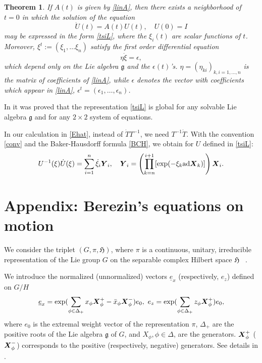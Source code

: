 \documentclass[12pt]{amsart}
\numberwithin{equation}{section}
\newtheorem{Theorem}{Theorem}
\theoremstyle{definition}
\begin{document}
\begin{Theorem}
If $A(t)$ is  given by \eqref{linA},  then there exists a neighborhood
of $t=0$ in which the solution of the equation
\begin{equation}\label{dotU}
\dot{U}(t)=A(t)U(t), \quad U(0)=I
\end{equation}
may be expressed in the form \eqref{tsiL}, where the $\xi_i(t)$ are
scalar functions of $t$. Moreover, $\xi^t:=(\xi_1,\dots \xi_n)$ satisfy the first order 
differential equation
\begin{equation}\label{solwei}
\eta\dot{\xi}=\epsilon,
\end{equation}
 which depend only on the Lie algebra ${{\mathfrak{{g}}}}$
and the $\epsilon(t)$'s. $\eta=(\eta_{ki})_{k,i=1,\dots,n}$ is the matrix of coefficients of \eqref{linA}, while $\epsilon$
denotes the vector with coefficients which appear in \eqref{linA},  $ \epsilon^t=(\epsilon_1,\dots,\epsilon_n)$. 
\end{Theorem}
In \cite{wei} it was proved that the representation \eqref{tsiL} is
global for any solvable Lie algebra ${{\mathfrak{{g}}}}$ and for any $2\times 2$
system of equations. 

In our calculation  in \eqref{Ehat}, instead of $\dot{T}T^{-1}$, we need
$T^{-1}\dot{T}$. 
With the convention \eqref{conv} and the Baker-Hausdorff formula \eqref{BCH}, we obtain
for $U$ defined in \eqref{tsiL}:
\begin{equation}\label{timndot}
U^{-1}(\xi)\dot{U}(\xi)=\sum_{i=1}^n\dot{\xi}_i{{\mbox{\boldmath{${Y}$}}}}_i, \quad {{\mbox{\boldmath{${Y}$}}}}_i= \left(\prod_{k=n}^{i+1}[\exp(-\xi_k{{\mbox{\rm ad}}} {{\mbox{\boldmath{${X}$}}}}_k)]\right){{\mbox{\boldmath{${X}$}}}}_i.
\end{equation}

\section{Appendix: Berezin's equations on motion}\label{app2}
We  consider the triplet $(G, \pi , {{\mathfrak{{H}}}} )$, where $\pi$ is
 a continuous, unitary, irreducible 
representation
 of the  Lie group $G$
 on the   separable  complex  Hilbert space {\ensuremath{{{\mathfrak{{H}}}}}}~   \cite{perG}. 

We
 introduce the normalized (unnormalized) vectors  $\underline{e}_x$
(respectively, $e_z$) defined on $G/H$
\begin{equation}\label{bigch}
\underline{e}_x=\exp(\sum_{\phi\in\Delta_+}x_{\phi}{{\mbox{\boldmath{${X}$}}}}_{\phi}^+-\bar{x}_{\phi}{{\mbox{\boldmath{${X}$}}}}_{\phi}^-)
e_0, ~
e_z=\exp(\sum_{\phi\in\Delta_+}z_{\phi}{{\mbox{\boldmath{${X}$}}}}_{\phi}^+)e_0, 
\end{equation}
where
$e_0$ is the extremal weight vector of the representation $\pi$, $\Delta_+$ are the positive roots of the Lie algebra ${{\mathfrak{{g}}}}$ of $G$,
and $X_\phi,\phi\in\Delta$,  are the  generators. 
${{\mbox{\boldmath{${X}$}}}}^+_{\phi}$ (${{\mbox{\boldmath{${X}$}}}}^-_{\phi}$)
corresponds to the positive (respectively, negative) generators. See
details in  \cite{perG,sb6}.
\end{document}

